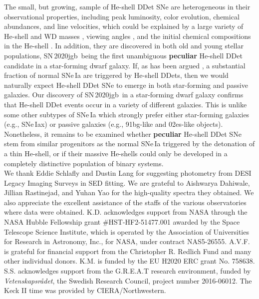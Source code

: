\documentclass[twocolumn]{aastex631}
\newcommand{\sn}{SN\,2020jgb}
\newcommand{\revise}[1]{\textbf{#1}}
\begin{document}
The small, but growing, sample of He-shell DDet SNe are heterogeneous in their observational properties, including peak luminosity, color evolution, chemical abundances, and line velocities, which could be explained by a large variety of He-shell and WD masses \citep{polin_observational_2019,Shen_2D_2021}, viewing angles \citep{Shen_2D_2021}, and the initial chemical compositions in the He-shell \citep{Kromer_DD_2010}. In addition, they are discovered in both old and young stellar populations, \sn\ being the first unambiguous \revise{peculiar} He-shell DDet candidate in a star-forming dwarf galaxy. If, as has been argued \citep[e.g.,][]{Sanders_2021, Eitner_2022}, a substantial fraction of normal SNe\,Ia are triggered by He-shell DDets, then we would naturally expect He-shell DDet SNe to emerge in both star-forming and passive galaxies. Our discovery of \sn\ in a star-forming dwarf galaxy confirms that He-shell DDet events occur in a variety of different galaxies. This is unlike some other subtypes of SNe\,Ia \citep{Jha_2019} which strongly prefer either star-forming galaxies (e.g., SNe\,Iax) or passive galaxies (e.g., 91bg-like and 02es-like objects). Nonetheless, it remains to be examined whether \revise{peculiar} He-shell DDet SNe stem from similar progenitors as the normal SNe\,Ia triggered by the detonation of a thin He-shell, or if their massive He-shells could only be developed in a completely distinctive population of binary systems.\\

\noindent We thank Eddie Schlafly and Dustin Lang for suggesting photometry from DESI Legacy Imaging Surveys in SED fitting. We are grateful to Aishwarya Dahiwale, Jillian Rastinejad, and Yuhan Yao for the high-quality spectra they obtained. We also appreciate the excellent assistance of the staffs of the various observatories where data were obtained. K.D. acknowledges support from NASA through the NASA Hubble Fellowship grant \#HST-HF2-51477.001 awarded by the Space Telescope Science Institute, which is operated by the Association of Universities for Research in Astronomy, Inc., for NASA, under contract NAS5-26555. A.V.F. is grateful for financial support from the Christopher R. Redlich Fund and many other individual donors. K.M. is funded by the EU H2020 ERC grant No. 758638. S.S. acknowledges support from the G.R.E.A.T research environment, funded by {\em Vetenskapsr\aa det}, the Swedish Research Council, project number 2016-06012. The Keck II time was provided by CIERA/Northwestern.
\end{document}
